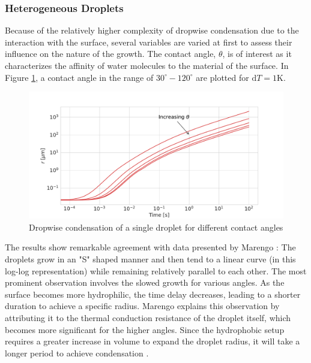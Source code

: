 \documentclass[12pt]{article}
\numberwithin{equation}{section}
\begin{document}
\subsubsection{Heterogeneous Droplets}
Because of the relatively higher complexity of dropwise condensation due to the interaction with the surface, several variables are varied at first to assess their influence on the nature of the growth. The contact angle, $\theta$, is of interest as it characterizes the affinity of water molecules to the material of the surface. In Figure \ref{f:dropwise theta change}, a contact angle in the range of $30^{\circ}-120^{\circ}$ are plotted for $\mathrm{d}T=1\mathrm{K}$.
\begin{figure}[H]
    \centering
    \includegraphics[trim={0 0 0 40},clip,width=1.0\textwidth]{Figures/dropwise_theta.pdf}
    \caption{Dropwise condensation of a single droplet for different contact angles}
    \label{f:dropwise theta change}
\end{figure}
The results show remarkable agreement with data presented by Marengo \cite{marengo2022surface}: The droplets grow in an "S" shaped manner and then tend to a linear curve (in this log-log representation) while remaining relatively parallel to each other. The most prominent observation involves the slowed growth for various angles. As the surface becomes more hydrophilic, the time delay decreases, leading to a shorter duration to achieve a specific radius. Marengo explains this observation by attributing it to the thermal conduction resistance of the droplet itself, which becomes more significant for the higher angles. Since the hydrophobic setup requires a greater increase in volume to expand the droplet radius, it will take a longer period to achieve condensation \cite{marengo2022surface}.
\end{document}
